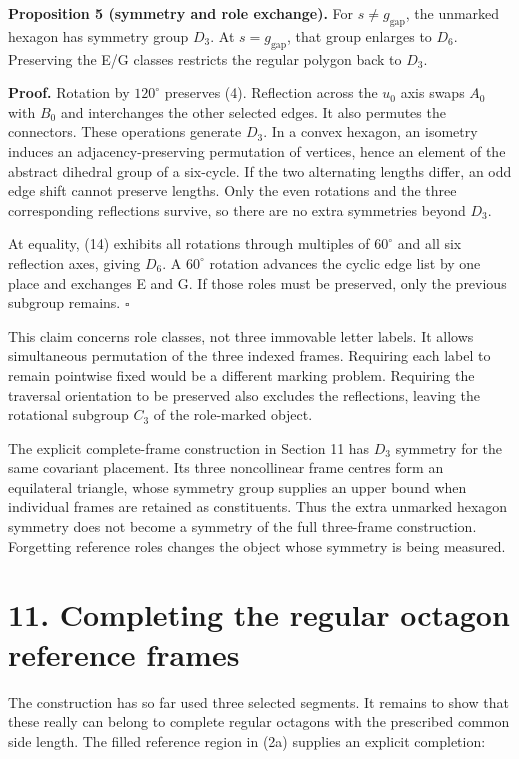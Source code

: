 \documentclass[
  11pt,
  a4paper,
]{article}
\begin{document}
\textbf{Proposition 5 (symmetry and role exchange).} For \(s\ne g_{\mathrm{gap}}\), the unmarked hexagon has symmetry group \(D_3\). At \(s=g_{\mathrm{gap}}\), that group enlarges to \(D_6\). Preserving the E/G classes restricts the regular polygon back to \(D_3\).

\textbf{Proof.} Rotation by \(120^\circ\) preserves (4). Reflection across the \(u_0\) axis swaps \(A_0\) with \(B_0\) and interchanges the other selected edges. It also permutes the connectors. These operations generate \(D_3\). In a convex hexagon, an isometry induces an adjacency-preserving permutation of vertices, hence an element of the abstract dihedral group of a six-cycle. If the two alternating lengths differ, an odd edge shift cannot preserve lengths. Only the even rotations and the three corresponding reflections survive, so there are no extra symmetries beyond \(D_3\).

At equality, (14) exhibits all rotations through multiples of \(60^\circ\) and all six reflection axes, giving \(D_6\). A \(60^\circ\) rotation advances the cyclic edge list by one place and exchanges E and G. If those roles must be preserved, only the previous subgroup remains. \(\square\)

This claim concerns role classes, not three immovable letter labels. It allows simultaneous permutation of the three indexed frames. Requiring each label to remain pointwise fixed would be a different marking problem. Requiring the traversal orientation to be preserved also excludes the reflections, leaving the rotational subgroup \(C_3\) of the role-marked object.

The explicit complete-frame construction in Section 11 has \(D_3\) symmetry for the same covariant placement. Its three noncollinear frame centres form an equilateral triangle, whose symmetry group supplies an upper bound when individual frames are retained as constituents. Thus the extra unmarked hexagon symmetry does not become a symmetry of the full three-frame construction. Forgetting reference roles changes the object whose symmetry is being measured.

\section{11. Completing the regular octagon reference frames}\label{completing-the-regular-octagon-reference-frames}

The construction has so far used three selected segments. It remains to show that these really can belong to complete regular octagons with the prescribed common side length. The filled reference region in (2a) supplies an explicit completion:
\end{document}
